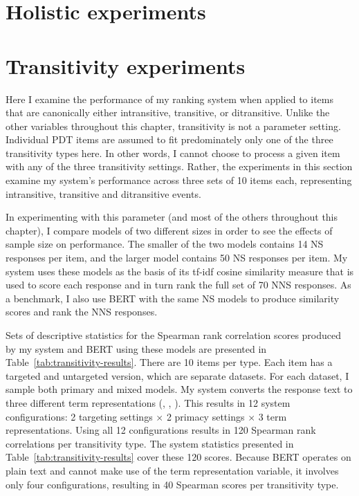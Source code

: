 \section{Holistic experiments}
\label{sec:exp-holistic}

\section{Transitivity experiments}
\label{sec:exp-transitivity}
Here I examine the performance of my ranking system when applied to items that are canonically either intransitive, transitive, or ditransitive. Unlike the other variables throughout this chapter, transitivity is not a parameter setting. Individual PDT items are assumed to fit predominately only one of the three transitivity types here. In other words, I cannot choose to process a given item with any of the three transitivity settings. Rather, the experiments in this section examine my system's performance across three sets of 10 items each, representing intransitive, transitive and ditransitive events.

In experimenting with this parameter (and most of the others throughout this chapter), I compare models of two different sizes in order to see the effects of sample size on performance. The smaller of the two models contains 14 NS responses per item, and the larger model contains 50 NS responses per item. My system uses these models as the basis of its tf-idf cosine similarity measure that is used to score each response and in turn rank the full set of 70 NNS responses. As a benchmark, I also use BERT with the same NS models to produce similarity scores and rank the NNS responses.

Sets of descriptive statistics for the Spearman rank correlation scores produced by my system and BERT using these models are presented in Table~\ref{tab:transitivity-results}. There are 10 items per type. Each item has a targeted and untargeted version, which are separate datasets. For each dataset, I sample both primary and mixed models. My system converts the response text to three different term representations (, , ). This results in 12 system configurations: 2 targeting settings $\times$ 2 primacy settings $\times$ 3 term representations. Using all 12 configurations results in 120 Spearman rank correlations per transitivity type. The system statistics presented in Table~\ref{tab:transitivity-results} cover these 120 scores. Because BERT operates on plain text and cannot make use of the term representation variable, it involves only four configurations, resulting in 40 Spearman scores per transitivity type.


